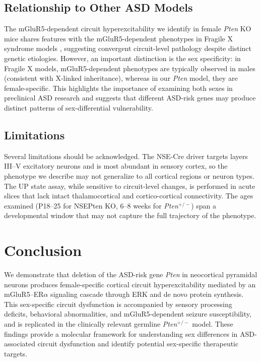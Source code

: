 \documentclass[11pt]{article}
\begin{document}
\subsection{Relationship to Other ASD Models}

The mGluR5-dependent circuit hyperexcitability we identify in female \textit{Pten} KO mice shares features with the mGluR5-dependent phenotypes in Fragile X syndrome models \citep{huber2002, hays2011}, suggesting convergent circuit-level pathology despite distinct genetic etiologies. However, an important distinction is the sex specificity: in Fragile X models, mGluR5-dependent phenotypes are typically observed in males (consistent with X-linked inheritance), whereas in our \textit{Pten} model, they are female-specific. This highlights the importance of examining both sexes in preclinical ASD research and suggests that different ASD-risk genes may produce distinct patterns of sex-differential vulnerability.

\subsection{Limitations}

Several limitations should be acknowledged. The NSE-Cre driver targets layers III--V excitatory neurons and is most abundant in sensory cortex, so the phenotype we describe may not generalize to all cortical regions or neuron types. The UP state assay, while sensitive to circuit-level changes, is performed in acute slices that lack intact thalamocortical and cortico-cortical connectivity. The ages examined (P18--25 for NSEPten KO, 6--8 weeks for \textit{Pten}$^{+/-}$) span a developmental window that may not capture the full trajectory of the phenotype.

\section{Conclusion}

We demonstrate that deletion of the ASD-risk gene \textit{Pten} in neocortical pyramidal neurons produces female-specific cortical circuit hyperexcitability mediated by an mGluR5--ER$\alpha$ signaling cascade through ERK and de novo protein synthesis. This sex-specific circuit dysfunction is accompanied by sensory processing deficits, behavioral abnormalities, and mGluR5-dependent seizure susceptibility, and is replicated in the clinically relevant germline \textit{Pten}$^{+/-}$ model. These findings provide a molecular framework for understanding sex differences in ASD-associated circuit dysfunction and identify potential sex-specific therapeutic targets.



\end{document}
